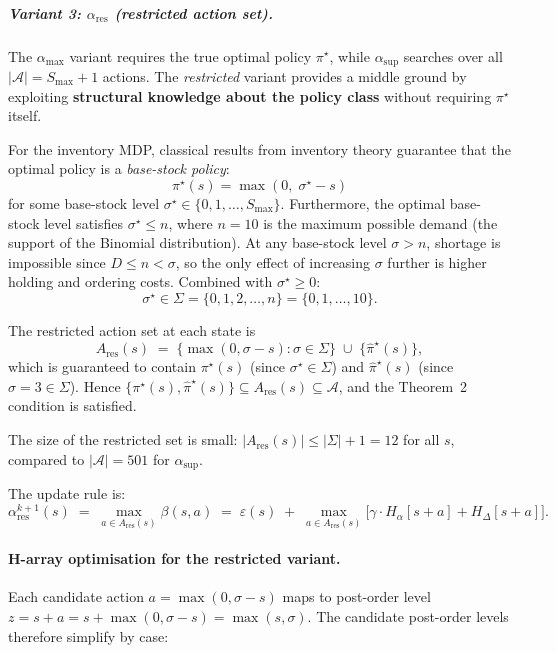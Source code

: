 \documentclass[11pt]{article}
\newcommand{\Smax}{S_{\max}}
\newcommand{\pistar}{\pi^\star}
\newcommand{\pihatstar}{\hat\pi^\star}
\newcommand{\alphares}{\alpha_{\mathrm{res}}}
\begin{document}
\subparagraph{Variant 3: $\alphares$ (restricted action set).}

The $\alpha_{\max}$ variant requires the true optimal policy $\pistar$, while
$\alpha_{\sup}$ searches over all $|\mathcal{A}| = \Smax + 1$ actions.  The
\emph{restricted} variant provides a middle ground by exploiting
\textbf{structural knowledge about the policy class} without requiring
$\pistar$ itself.

For the inventory MDP, classical results from inventory theory guarantee that
the optimal policy is a \emph{base-stock policy}:
\[
  \pistar(s) = \max(0,\; \sigma^\star - s)
\]
for some base-stock level $\sigma^\star \in \{0, 1, \ldots, \Smax\}$.
Furthermore, the optimal base-stock level satisfies $\sigma^\star \le n$,
where $n = 10$ is the maximum possible demand (the support of the Binomial
distribution).  At any base-stock level $\sigma > n$, shortage is impossible
since $D \le n < \sigma$, so the only effect of increasing $\sigma$ further is
higher holding and ordering costs.  Combined with $\sigma^\star \ge 0$:
\[
  \sigma^\star \in \Sigma = \{0, 1, 2, \ldots, n\} = \{0, 1, \ldots, 10\}.
\]

The restricted action set at each state is
\begin{equation}\label{eq:restricted-action-set}
  A_{\mathrm{res}}(s)
  \;=\; \bigl\{\max(0, \sigma - s) : \sigma \in \Sigma\bigr\}
        \;\cup\; \bigl\{\pihatstar(s)\bigr\},
\end{equation}
which is guaranteed to contain $\pistar(s)$ (since $\sigma^\star \in \Sigma$)
and $\pihatstar(s)$ (since $\hat\sigma = 3 \in \Sigma$).  Hence
$\{\pistar(s), \pihatstar(s)\} \subseteq A_{\mathrm{res}}(s) \subseteq
\mathcal{A}$, and the Theorem~2 condition is satisfied.

The size of the restricted set is small: $|A_{\mathrm{res}}(s)| \le
|\Sigma| + 1 = 12$ for all $s$, compared to $|\mathcal{A}| = 501$ for
$\alpha_{\sup}$.

The update rule is:
\begin{equation}\label{eq:alpha-restricted}
  \alpha^{k+1}_{\mathrm{res}}(s)
  \;=\; \max_{a \in A_{\mathrm{res}}(s)}  \beta(s, a)
  \;=\; \varepsilon(s)
  \;+\; \max_{a \in A_{\mathrm{res}}(s)}
        \bigl[\gamma \cdot H_\alpha[s+a] + H_\Delta[s+a]\bigr].
\end{equation}

\paragraph{H-array optimisation for the restricted variant.}
Each candidate action $a = \max(0, \sigma - s)$ maps to post-order level
$z = s + a = s + \max(0, \sigma - s) = \max(s, \sigma)$.  The candidate
post-order levels therefore simplify by case:
\end{document}
